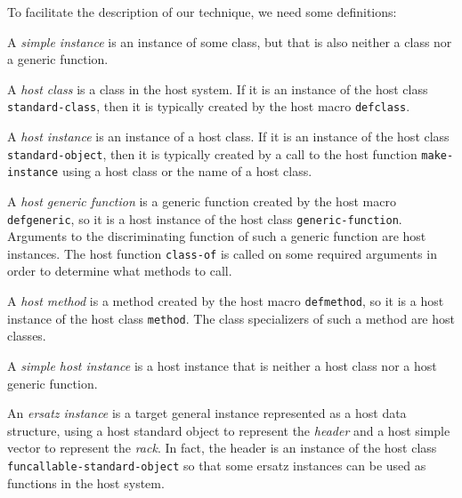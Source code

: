 To facilitate the description of our technique, we need some
definitions:

\begin{definition}
A \emph{simple instance} is an instance of some class, but that is
also neither a class nor a generic function.
\end{definition}

\begin{definition}
A \emph{host class} is a class in the host system.  If it is an
instance of the host class \texttt{standard-class}, then it is
typically created by the host macro \texttt{defclass}.
\end{definition}

\begin{definition}
A \emph{host instance} is an instance of a host class.  If it is an
instance of the host class \texttt{standard-object}, then it is
typically created by a call to the host function
\texttt{make-instance} using a host class or the name of a host class.
\end{definition}

\begin{definition}
A \emph{host generic function} is a generic function created by the
host macro \texttt{defgeneric}, so it is a host instance of the host
class \texttt{generic-function}.  Arguments to the discriminating
function of such a generic function are host instances.  The host
function \texttt{class-of} is called on some required arguments in
order to determine what methods to call.
\end{definition}

\begin{definition}
A \emph{host method} is a method created by the host macro
\texttt{defmethod}, so it is a host instance of the host class
\texttt{method}.  The class specializers of such a method are host
classes.
\end{definition}

\begin{definition}
A \emph{simple host instance} is a host instance that is neither a
host class nor a host generic function.
\end{definition}

\begin{definition}
An \emph{ersatz instance} is a target general instance represented as
a host data structure, using a host standard object to represent the
\emph{header} and a host simple vector to represent the \emph{rack}.
In fact, the header is an instance of the host class
\texttt{funcallable-standard-object} so that some ersatz instances can
be used as functions in the host system.
\end{definition}

